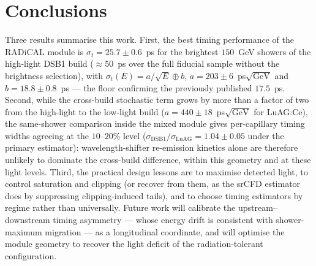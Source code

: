 \documentclass[final,5p,times,twocolumn]{elsarticle}
\begin{document}
\section{Conclusions}
\label{sec:conclusions}

Three results summarise this work. First, the best timing performance of the RADiCAL
module is $\sigma_t = 25.7\pm0.6$~ps for the brightest $150$~GeV showers of the
high-light DSB1 build ($\approx\!50$~ps over the full fiducial sample without the
brightness selection), with $\sigma_t(E) = a/\sqrt{E}\oplus b$, $a = 203\pm6$~ps$\sqrt{\mathrm{GeV}}$
and $b = 18.8\pm0.8$~ps --- the floor confirming the previously published $17.5$~ps.
Second, while the cross-build stochastic term grows by more than a factor of two from
the high-light to the low-light build ($a = 440\pm18$~ps$\sqrt{\mathrm{GeV}}$ for
LuAG:Ce), the same-shower comparison inside the mixed module gives per-capillary timing
widths agreeing at the $10$--$20\%$ level ($\sigma_\mathrm{DSB1}/\sigma_\mathrm{LuAG}
= 1.04\pm0.05$ under the primary estimator): wavelength-shifter re-emission kinetics
alone are therefore unlikely to dominate the cross-build difference, within this
geometry and at these light levels. Third, the practical design lessons are to maximise
detected light, to control saturation and clipping (or recover from them, as the srCFD
estimator does by suppressing clipping-induced tails), and to choose timing estimators
by regime rather than universally. Future work will calibrate the upstream--downstream
timing asymmetry --- whose energy drift is consistent with shower-maximum migration ---
as a longitudinal coordinate, and will optimise the module geometry to recover the
light deficit of the radiation-tolerant configuration.

\appendix
\end{document}
